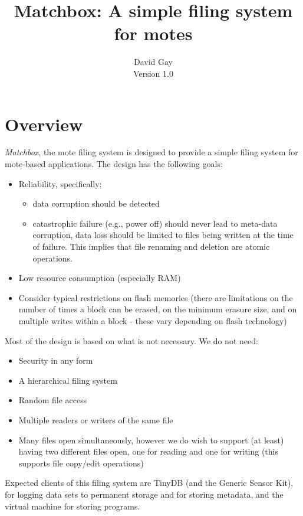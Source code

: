 \documentclass[10pt]{article}
\title{Matchbox: A simple filing system for motes}
\author{David Gay \\
Version 1.0}
\begin{document}
  
\maketitle

\section{Overview}

\emph{Matchbox}, the mote filing system is designed to provide a simple
filing system for mote-based applications. The design has the following
goals:
\begin{itemize}
\item Reliability, specifically:
  \begin{itemize}
  \item data corruption should be detected
  \item catastrophic failure (e.g., power off) should never lead to meta-data
    corruption, data loss should be limited to files being written at the
    time of failure. This implies that file renaming and deletion are 
    atomic operations.
  \end{itemize}
\item Low resource consumption (especially RAM)
\item Consider typical restrictions on flash memories (there are limitations
on the number of times a block can be erased, on the minimum erasure size,
and on multiple writes within a block - these vary depending on flash
technology)
\end{itemize}

Most of the design is based on what is not necessary. We do not need:
\begin{itemize}
\item Security in any form
\item A hierarchical filing system
\item Random file access
\item Multiple readers or writers of the same file
\item Many files open simultaneously, however we do wish to support (at
  least) having two different files open, one for reading and one for
  writing (this supports file copy/edit operations)
\end{itemize}

Expected clients of this filing system are TinyDB (and the Generic Sensor
Kit), for logging data sets to permanent storage and for storing metadata,
and the virtual machine for storing programs.
\end{document}
